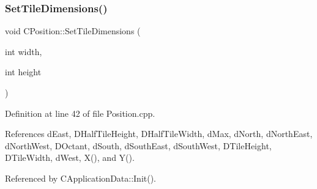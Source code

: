 \subsubsection{\texorpdfstring{Set\+Tile\+Dimensions()}{SetTileDimensions()}}
{\footnotesize\ttfamily void C\+Position\+::\+Set\+Tile\+Dimensions (\begin{DoxyParamCaption}\item[{int}]{width,  }\item[{int}]{height }\end{DoxyParamCaption})\hspace{0.3cm}{\ttfamily [static]}}



Definition at line 42 of file Position.\+cpp.



References d\+East, D\+Half\+Tile\+Height, D\+Half\+Tile\+Width, d\+Max, d\+North, d\+North\+East, d\+North\+West, D\+Octant, d\+South, d\+South\+East, d\+South\+West, D\+Tile\+Height, D\+Tile\+Width, d\+West, X(), and Y().



Referenced by C\+Application\+Data\+::\+Init().


